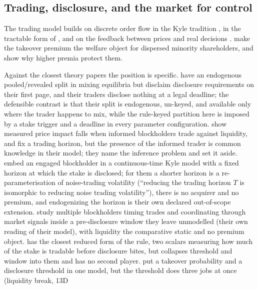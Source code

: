 \documentclass[11pt]{article}
\begin{document}
\subsection{Trading, disclosure, and the market for control}
\label{sec:lit-microstructure}

The trading model builds on discrete order flow in the Kyle tradition \citep{Kyle1985,
GlostenMilgrom1985}, in the tractable form of \citet{EdmansGoldsteinJiang2015}, and on the feedback
between prices and real decisions \citep{EdmansGoldsteinJiang2012, BondEdmansGoldstein2012,
Goldstein2023}. \citet{GrossmanHart1980} make the takeover premium the welfare object for dispersed
minority shareholders, and \citet{BurkartGrombPanunzi1998} show why higher premia protect them.

Against the closest theory papers the position is specific. \citet{KyleVila1991} have an endogenous
pooled/revealed split in mixing equilibria but disclaim disclosure requirements on their first page,
and their traders disclose nothing at a legal deadline; the defensible contrast is that their split
is endogenous, un-keyed, and available only where the trader happens to mix, while the rule-keyed
partition here is imposed by a stake trigger and a deadline in every parameter configuration.
\citet{CollinDufresneFos2015} show measured price impact falls when informed blockholders trade
against liquidity, and \citet{CollinDufresneFos2016} fix a trading horizon, but the presence of the
informed trader is common knowledge in their model; they name the inference problem and set it
aside. \citet{BackEtAl2018} embed an engaged blockholder in a continuous-time Kyle model with a
fixed horizon at which the stake is disclosed; for them a shorter horizon is a re-parameterisation
of noise-trading volatility (``reducing the trading horizon $T$ is isomorphic to reducing noise
trading volatility''), there is no acquirer and no premium, and endogenizing the horizon is their
own declared out-of-scope extension. \citet{CetemenCisternasKolbViswanathan2026} study multiple
blockholders timing trades and coordinating through market signals inside a pre-disclosure window
they leave unmodelled (their own reading of their model), with liquidity the comparative static
and no premium object. \citet{Corum2025} has the closest reduced form of the rule, two scalars
measuring how much of the stake is tradable before disclosure bites, but collapses threshold and
window into them and has no second player. \citet{CorumLevit2019} put a takeover probability and a
disclosure threshold in one model, but the threshold does three jobs at once (liquidity break, 13D
\end{document}
